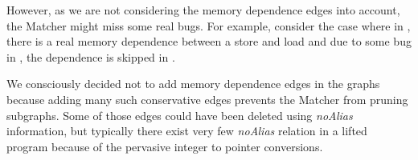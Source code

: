 However, as we are not considering the memory dependence edges into account, 
the Matcher might miss some real bugs. For example, consider the case where in 
\FP, there is a real memory dependence between a store and load and due to some 
bug in \mcsema, the dependence is skipped in \F. 

We consciously decided not to add memory dependence edges in the graphs because 
adding many such 
conservative edges prevents the Matcher from pruning subgraphs. Some of those 
edges could have been deleted using \emph{noAlias} information, 
but typically there exist very few \emph{noAlias} relation in a lifted program 
because of the pervasive integer to pointer conversions.



%

